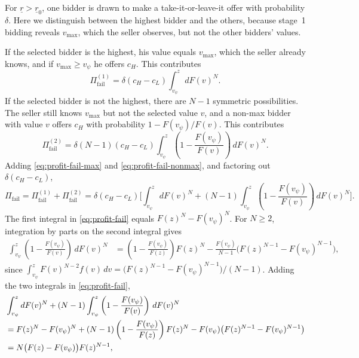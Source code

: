 For $\underline{r}>\underline{r}_0$, one bidder is drawn to make a
take-it-or-leave-it offer with probability $\delta$.
Here we distinguish between the highest bidder and the others, because stage~1
bidding reveals $v_{\max}$, which the seller observes, but not the other bidders'
values.

If the selected bidder is the highest, his value
equals $v_{\max}$, which the seller already knows, and if $v_{\max}\ge v_{\psi}$
he offers $c_H$.
This contributes
\begin{equation}
  \Pi_{\text{fail}}^{(1)}
  = \delta (c_H - c_L)
    \int_{v_{\psi}}^{z} dF(v)^{N}.
  \label{eq:profit-fail-max}
\end{equation}
If the selected bidder is not the highest, there are $N-1$ symmetric
possibilities.
The seller still knows $v_{\max}$ but not the selected value $v$, and a non-max
bidder with value $v$ offers $c_H$ with probability $1-F(v_{\psi})/F(v)$.
This contributes
\begin{equation}
  \Pi_{\text{fail}}^{(2)}
  = \delta (N-1) (c_H - c_L)
    \int_{v_{\psi}}^{z}
      \left(1 - \frac{F(v_{\psi})}{F(v)}\right)\, dF(v)^{N}.
  \label{eq:profit-fail-nonmax}
\end{equation}
Adding \eqref{eq:profit-fail-max} and \eqref{eq:profit-fail-nonmax}, and factoring
out $\delta(c_H-c_L)$,
\begin{equation}
  \Pi_{\text{fail}}
  = \Pi_{\text{fail}}^{(1)} + \Pi_{\text{fail}}^{(2)}
  = \delta (c_H - c_L)
    \Biggl[
      \int_{v_{\psi}}^{z} dF(v)^{N}
      + (N-1)
      \int_{v_{\psi}}^{z}
        \left(1 - \frac{F(v_{\psi})}{F(v)}\right)\, dF(v)^{N}
    \Biggr].
  \label{eq:profit-fail}
\end{equation}
The first integral in \eqref{eq:profit-fail} equals
$F(z)^{N}-F(v_{\psi})^{N}$.
For $N\ge 2$, integration by parts on the second integral gives
\begin{align}
  \int_{v_{\psi}}^{z}
    \left(1 - \frac{F(v_{\psi})}{F(v)}\right)\, dF(v)^{N}
  &= \left(1 - \frac{F(v_{\psi})}{F(z)}\right) F(z)^{N}
    - \frac{F(v_{\psi})}{N-1}
      \bigl(F(z)^{N-1} - F(v_{\psi})^{N-1}\bigr),
  \label{eq:profit-fail-nonmax-int}
\end{align}
since $\int_{v_{\psi}}^{z} F(v)^{N-2} f(v)\, dv
=\bigl(F(z)^{N-1}-F(v_{\psi})^{N-1}\bigr)/(N-1)$.
Adding the two integrals in \eqref{eq:profit-fail},
\begin{align}
  &\int_{v_{\psi}}^{z} dF(v)^{N}
    + (N-1)
    \int_{v_{\psi}}^{z}
      \left(1 - \frac{F(v_{\psi})}{F(v)}\right)\, dF(v)^{N}
  \notag\\
  &= F(z)^{N} - F(v_{\psi})^{N}
    + (N-1)\left(1 - \frac{F(v_{\psi})}{F(z)}\right) F(z)^{N}
    - F(v_{\psi})\bigl(F(z)^{N-1} - F(v_{\psi})^{N-1}\bigr)
  \notag\\
  &= N\bigl(F(z) - F(v_{\psi})\bigr) F(z)^{N-1},
  \label{eq:profit-fail-bracket}
\end{align}
